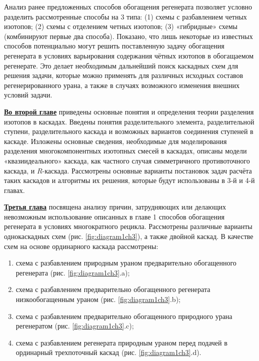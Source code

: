 Анализ ранее предложенных способов обогащения регенерата позволяет условно разделить рассмотренные способы на 3 типа: (1) схемы с разбавлением четных изотопов; (2) схемы с отделением четных изотопов; (3) «гибридные» схемы (комбинируют первые два способа).
Показано, что лишь некоторые из известных способов потенциально могут решить поставленную задачу обогащения регенерата в условиях варьирования содержания чётных изотопов в обогащаемом регенерате. Это делает необходимым дальнейший поиск каскадных схем для решения задачи, которые можно применять для различных исходных составов регенерированного урана, а также в случаях возможного изменения внешних условий задачи. 

\underline{\textbf{Во второй главе}} приведены основные понятия и определения теории разделения изотопов в каскадах. Введены понятия  разделительного элемента, разделительной ступени, разделительного каскада и возможных вариантов соединения ступеней в каскаде. Изложены основные сведения, необходимые для моделирования разделения многокомпонентных изотопных смесей в каскадах, описаны модели «квазиидеального» каскада, как частного случая симметричного противоточного каскада, и $R$-каскада. Рассмотрены основные варианты постановок задач расчёта таких каскадов и алгоритмы их решения, которые будут использованы в 3-й и 4-й главах. 

\underline{\textbf{Третья глава}} посвящена анализу причин, затрудняющих или делающих невозможным использование описанных в главе 1 способов обогащения регенерата в условиях многократного рецикла. Рассмотрены различные варианты однокаскадных схем (рис. \ref{fig:diagram1ch3}), а также двойной каскад. В качестве схем на основе ординарного каскада рассмотрены:

\begin{enumerate}
  \item схема с разбавлением природным ураном предварительно обогащенного регенерата (рис. \ref{fig:diagram1ch3}.a);
  \item схема с разбавлением предварительно обогащенного регенерата низкообогащенным ураном (рис. \ref{fig:diagram1ch3}.b);
  \item схема с разбавлением предварительно обогащенного природного урана регенератом (рис. \ref{fig:diagram1ch3}.c);
  \item схема с разбавлением регенерата природным ураном перед подачей в ординарный трехпоточный каскад (рис. \ref{fig:diagram1ch3}.d).
\end{enumerate}


